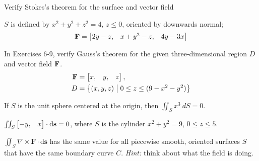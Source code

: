 \documentclass[boxes]{gsypset}
\newcommand{\dv}[1]{\cdot \mathrm{d}\mathbf{#1}}
\begin{document}
\begin{problem}[7.3.4]
	Verify Stokes's theorem for the surface and vector field
	
	$S$ is defined by $x^2+y^2+z^2=4$, $z \leq 0$, oriented by downwards normal;
	\[
		\mathbf{F} = \begin{bmatrix}2y - z, & x + y^2 - z, & 4y - 3x\end{bmatrix}
	\]
\end{problem}
\begin{solution}
	
\end{solution}

\begin{problem}[7.3.6]
	In Exercises 6-9, verify Gauss's theorem for the given 
	three-dimensional region $D$ and vector field $\bf{F}$.
	\begin{align*}
		\mathbf{F} &= \begin{bmatrix}x, & y, & z\end{bmatrix}, \\
		D &= \left\{(x,y,z) \;\big|\; 0 \leq z \leq (9-x^2-y^2)\right\}
	\end{align*}
\end{problem}
\begin{solution}
	
\end{solution}

\begin{problem*}
	\begin{subproblems}[1.]
		\subproblem[6.]
			If $S$ is the unit sphere centered at the origin, then $\iint_Sx^3~dS=0$.
			\begin{solution}
				
			\end{solution}
		\subproblem[10.]
			$\iint_S\bm{-y, & x}\dv{s} = 0$, where 
			$S$ is the cylinder $x^2+y^2=9$, $0\leq z\leq5$.
			\begin{solution}
				
			\end{solution}
		\subproblem[18.]
			$\iint_S\nabla\times\mathbf{F} \dv{s}$ has the same value for all 
			piecewise smooth, oriented surfaces $S$ that have the same boundary curve $C$.
			\textit{Hint:} think about what the field is doing.
			\begin{solution}
				
			\end{solution}
	\end{subproblems}
\end{problem*}
\end{document}

